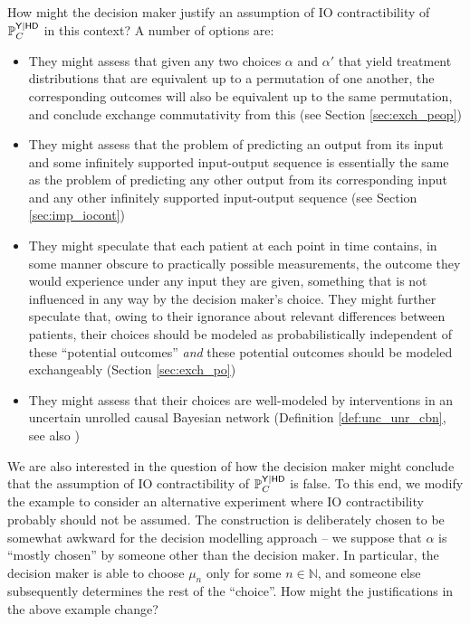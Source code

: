 \begin{example}
How might the decision maker justify an assumption of IO contractibility of $\mathbb{P}_C^{\mathsf{Y}|\mathsf{HD}}$ in this context? A number of options are:
\begin{itemize}
    \item They might assess that given any two choices $\alpha$ and $\alpha'$ that yield treatment distributions that are equivalent up to a permutation of one another, the corresponding outcomes will also be equivalent up to the same permutation, and conclude exchange commutativity from this (see Section \ref{sec:exch_peop})
    \item They might assess that the problem of predicting an output from its input and some infinitely supported input-output sequence is essentially the same as the problem of predicting any other output from its corresponding input and any other infinitely supported input-output sequence (see Section \ref{sec:imp_iocont})
    \item They might speculate that each patient at each point in time contains, in some manner obscure to practically possible measurements, the outcome they would experience under any input they are given, something that is not influenced in any way by the decision maker's choice. They might further speculate that, owing to their ignorance about relevant differences between patients, their choices should be modeled as probabilistically independent of these ``potential outcomes'' \emph{and} these potential outcomes should be modeled exchangeably (Section \ref{sec:exch_po})
    \item They might assess that their choices are well-modeled by interventions in an uncertain unrolled causal Bayesian network (Definition \ref{def:unc_unr_cbn}, see also \citet[Ch. ~4]{pearl_book_2018})
\end{itemize}
\end{example}

We are also interested in the question of how the decision maker might conclude that the assumption of IO contractibility of $\mathbb{P}_C^{\mathsf{Y}|\mathsf{HD}}$ is false. To this end, we modify the example to consider an alternative experiment where IO contractibility probably should not be assumed. The construction is deliberately chosen to be somewhat awkward for the decision modelling approach -- we suppose that $\alpha$ is ``mostly chosen'' by someone other than the decision maker. In particular, the decision maker is able to choose $\mu_n$ only for some $n\in \mathbb{N}$, and someone else subsequently determines the rest of the ``choice''. How might the justifications in the above example change?

